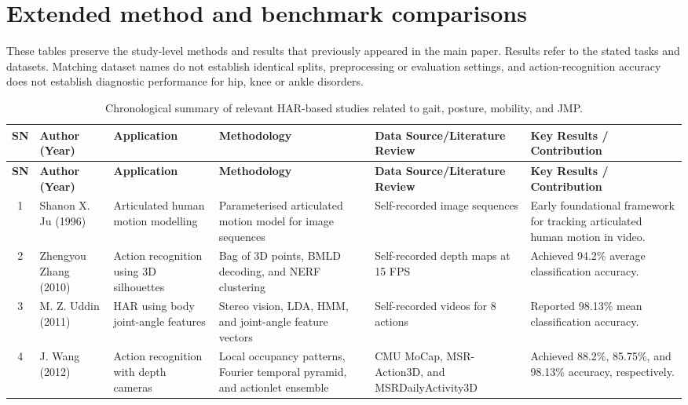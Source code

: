 \documentclass[12pt]{elsarticle}
\begin{document}
\section{Extended method and benchmark comparisons}
\begin{revision}
These tables preserve the study-level methods and results that previously appeared in the main paper. Results refer to the stated tasks and datasets. Matching dataset names do not establish identical splits, preprocessing or evaluation settings, and action-recognition accuracy does not establish diagnostic performance for hip, knee or ankle disorders.
\end{revision}
{\scriptsize\setlength{\tabcolsep}{3pt}\begin{longtable}{c p{2.7cm} p{2.8cm} p{3.3cm} p{3.4cm} p{3.6cm}}
\caption{Chronological summary of relevant HAR-based studies related to gait, posture, mobility, and JMP.}
\label{HAR_M_A}\\
\hline
\textbf{SN} & \textbf{Author (Year)} & \textbf{Application} & \textbf{Methodology} & \textbf{Data Source/Literature Review} & \textbf{Key Results / Contribution} \\
\hline
\endfirsthead

\hline
\textbf{SN} & \textbf{Author (Year)} & \textbf{Application} & \textbf{Methodology} & \textbf{Data Source/Literature Review} & \textbf{Key Results / Contribution} \\
\hline
\endhead

1 & Shanon X. Ju \cite{ju1996cardboard} (1996) & Articulated human motion modelling & Parameterised articulated motion model for image sequences & Self-recorded image sequences & Early foundational framework for tracking articulated human motion in video. \\
\hline

2 & Zhengyou Zhang \cite{li2010action} (2010) & Action recognition using 3D silhouettes & Bag of 3D points, BMLD decoding, and NERF clustering & Self-recorded depth maps at 15 FPS & Achieved 94.2\% average classification accuracy. \\
\hline

3 & M. Z. Uddin \cite{uddin2011human} (2011) & HAR using body joint-angle features & Stereo vision, LDA, HMM, and joint-angle feature vectors & Self-recorded videos for 8 actions & Reported 98.13\% mean classification accuracy. \\
\hline

4 & J. Wang \cite{wang2012mining} (2012) & Action recognition with depth cameras & Local occupancy patterns, Fourier temporal pyramid, and actionlet ensemble & CMU MoCap, MSR-Action3D, and MSRDailyActivity3D & Achieved 88.2\%, 85.75\%, and 98.13\% accuracy, respectively. \\
\hline


\end{longtable}}
\end{document}
